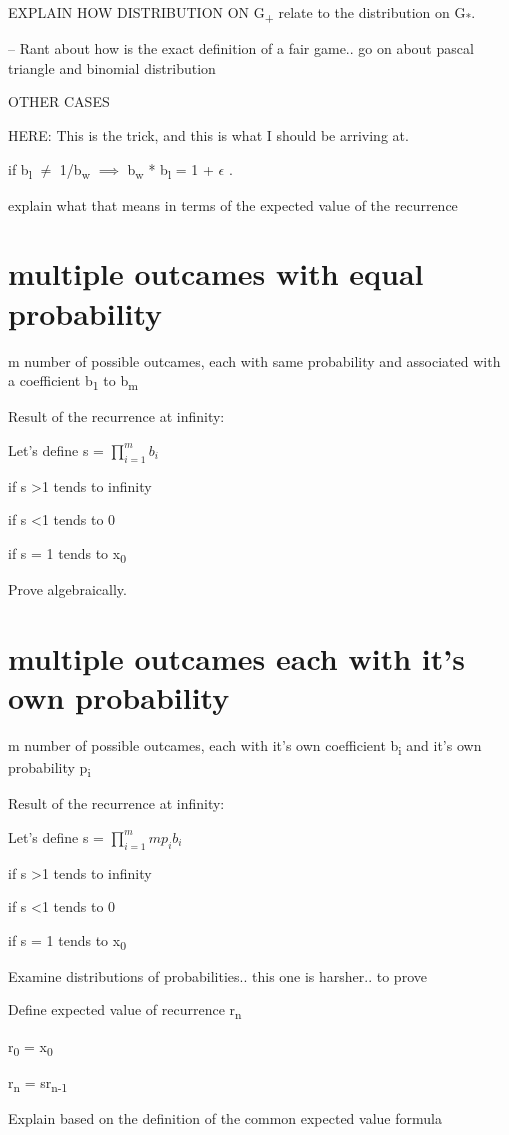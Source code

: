 \documentclass[12pt,reqno]{amsart}
\begin{document}
EXPLAIN HOW DISTRIBUTION ON G\textsubscript{+} relate to the distribution on G\textsubscript{*}.

-- Rant about how is the exact definition of a fair game.. go on about pascal triangle and binomial distribution


OTHER CASES

HERE: This is the trick, and this is what I should be arriving at.

if b\textsubscript{l} $\neq$ 1/b\textsubscript{w}  $\implies$  b\textsubscript{w} * b\textsubscript{l} = 1 + $\epsilon$ .

explain what that means in terms of the expected value of the recurrence


\section{multiple outcames with equal probability}

m number of possible outcames, each with same probability and associated with a coefficient b\textsubscript{1} to b\textsubscript{m}



Result of the recurrence at infinity:



Let's define s = $\prod_{i=1}^{m} b_{i}$

if s \textgreater 1 tends to infinity

if s \textless 1 tends to 0

if s = 1 tends to x\textsubscript{0}


Prove algebraically.

\section{multiple outcames each with it's own probability}

m number of possible outcames, each with it's own coefficient b\textsubscript{i} and it's own probability p\textsubscript{i}

Result of the recurrence at infinity:

Let's define s = $\prod_{i=1}^{m} mp_{i}b_{i}$



if s \textgreater 1 tends to infinity

if s \textless 1 tends to 0

if s = 1 tends to x\textsubscript{0}



Examine distributions of probabilities.. this one is harsher.. to prove



Define expected value of recurrence r\textsubscript{n}

r\textsubscript{0} = x\textsubscript{0}

r\textsubscript{n} = sr\textsubscript{n-1}

Explain based on the definition of the common expected value formula
\end{document}
